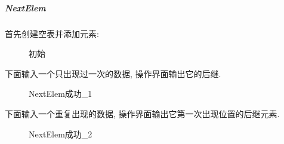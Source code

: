 \documentclass[supercite]{Experimental_Report}
\theoremstyle{definition}
\begin{document}
\subparagraph{NextElem}
\noindent
首先创建空表并添加元素:
\begin{figure}[htbp]
	\centering
	\centering
	\centering
	\caption{初始}
	\label{fig1-36}
\end{figure}

\noindent
下面输入一个只出现过一次的数据, 操作界面输出它的后继.
\begin{figure}[htbp]
	\centering
	\centering
	\caption{NextElem成功\_1}
	\label{fig1-37}
\end{figure}

\clearpage
\noindent
下面输入一个重复出现的数据, 操作界面输出它第一次出现位置的后继元素.
\begin{figure}[htbp]
	\centering
	\centering
	\caption{NextElem成功\_2}
	\label{fig1-38}
\end{figure}
\end{document}
